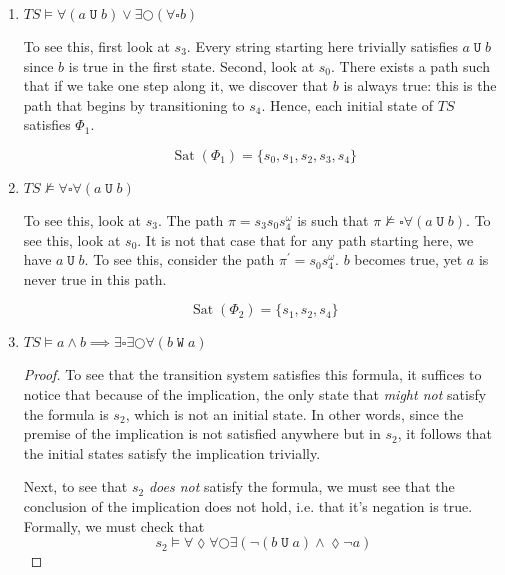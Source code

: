 \documentclass[letterpaper,11pt]{article}
\newcommand{\eventually}{\lozenge}
\newcommand{\always}{\square}
\newcommand{\nmodels}{\nvDash}
\newcommand{\step}{\bigcirc}
\DeclareMathOperator{\untilOp}{\mathtt{U}}
\newcommand{\until}{\untilOp{}}
\DeclareMathOperator{\wuntilOp}{\mathtt{W}}
\newcommand{\wuntil}{\wuntilOp{}}
\newcommand{\parens}[1]{\left(#1\right)}
\DeclareMathOperator{\Sat}{Sat}
\newcommand{\sat}[1]{\Sat{\parens{#1}}}
\begin{document}
\begin{enumerate}
    \item $TS \models \forall (a \until b) \lor \exists \step (\forall \always b)$

        To see this, first look at $s_3$. Every string starting here trivially
        satisfies $a \until b$ since $b$ is true in the first state.
        Second, look at $s_0$. There exists a path such that if we take one
        step along it, we discover that $b$ is always true: this is the path
        that begins by transitioning to $s_4$. Hence, each initial state of
        $TS$ satisfies $\Phi_1$.

        \begin{equation*}
            \sat{\Phi_1} = \{ s_0, s_1, s_2, s_3, s_4 \}
        \end{equation*}

    \item $TS \nmodels \forall \always \forall (a \until b)$

        To see this, look at $s_3$. The path $\pi = s_3 s_0 s_4^\omega$
        is such that $\pi \nmodels \always \forall (a \until b)$. To see this,
        look at $s_0$. It is not that case that for any path starting here, we
        have $a \until b$. To see this, consider the path
        $\pi^\prime = s_0 s_4^\omega$. $b$ becomes true, yet $a$ is never true
        in this path.

        \begin{equation*}
            \sat{\Phi_2} = \{ s_1, s_2, s_4 \}
        \end{equation*}

    \item $
        TS \models
        a \land b
        \implies
        \exists \always \exists \step \forall \parens{b \wuntil a}
        $

        \begin{proof}
            To see that the transition system satisfies this formula, it
            suffices to notice that because of the implication, the only state
            that \emph{might not} satisfy the formula is $s_2$, which is not an
            initial state. In other words, since the premise of the implication
            is not satisfied anywhere but in $s_2$, it follows that the initial
            states satisfy the implication trivially.

            Next, to see that $s_2$ \emph{does not} satisfy the formula, we
            must see that the conclusion of the implication does not hold, i.e.
            that it's negation is true. Formally, we must check that
            \begin{equation*}
                s_2 \models
                \forall \eventually \forall \step \exists \parens{
                    \neg\parens{b \until a}
                    \land
                    \eventually \neg a
                }
            \end{equation*}


\end{proof}
\end{enumerate}
\end{document}

